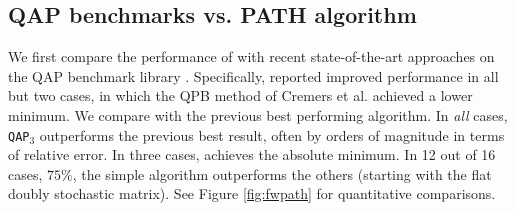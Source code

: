 \documentclass[10pt,journal,cspaper,compsoc]{IEEEtran}
\begin{document}


\subsection{QAP benchmarks vs. PATH algorithm}

We first compare the performance of \qapn with recent state-of-the-art approaches on the QAP benchmark library \cite{Burkard1997}.  Specifically, \cite{Zaslavskiy2009} reported improved performance in all but two cases, in which the QPB method of Cremers et al. \cite{Schellewald2001} achieved a lower minimum.  We compare \qapn with the previous best performing algorithm.  In \emph{all} cases, \texttt{QAP}$_3$ outperforms the previous best result, often by orders of magnitude in terms of relative error. In three cases, \qapb achieves the absolute minimum.  In 12 out of 16 cases, $75\%$, the simple \qapa algorithm outperforms the others (starting with the flat doubly stochastic matrix).  See Figure \ref{fig:fwpath} for quantitative comparisons.
\end{document}
